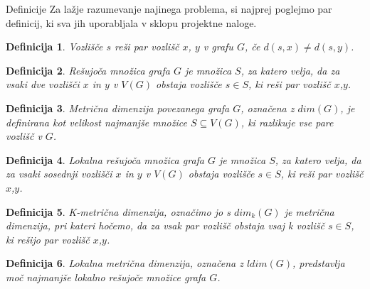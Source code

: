 \documentclass[12pt,a4paper]{amsart}
\makeatletter
\renewcommand\section{\@startsection{section}{1}%
  \z@{.5\linespacing\@plus.7\linespacing}{.5\linespacing}%
  {\normalfont\scshape\large\centering}}
\theoremstyle{plain} %
\newtheorem{definition}{Definicija}[section]
\makeatother
\begin{document}
\bigskip
\section{Definicije}
Za lažje razumevanje najinega problema, si najprej poglejmo par definicij, ki sva jih uporabljala v sklopu projektne naloge.
\begin{definition}
        Vozlišče $s$ reši par vozlišč $x$, $y$ v grafu $G$, če $d(s,x) \neq d(s,y)$.
    \end{definition}

    \begin{definition}
        Rešujoča množica grafa $G$ je množica $S$, za katero velja, da za vsaki dve 
        vozlišči $x$ in $y$ v $V(G)$ obstaja vozlišče $s \in S$, ki reši par vozlišč $x$,$y$.
    \end{definition}

    \begin{definition}
        Metrična dimenzija povezanega grafa $G$, označena z $dim(G)$, je definirana kot velikost najmanjše 
        množice $S \subseteq V(G)$, ki razlikuje vse pare vozlišč v $G$.
    \end{definition}     

    \begin{definition}
        Lokalna rešujoča množica grafa $G$ je množica $S$, za katero velja, da za vsaki sosednji 
        vozlišči $x$ in $y$ v $V(G)$ obstaja vozlišče $s \in S$, ki reši par vozlišč $x$,$y$.
    \end{definition}

    \begin{definition}
        K-metrična dimenzija, označimo jo s $dim_k(G)$ je metrična dimenzija, 
        pri kateri hočemo, da za vsak par vozlišč obstaja vsaj k vozlišč $s \in S$, ki rešijo par vozlišč $x$,$y$.
    \end{definition}   
    
    \begin{definition}
        Lokalna metrična dimenzija, označena z $ldim(G)$, predstavlja moč najmanjše 
        lokalno rešujoče množice grafa $G$.
    \end{definition} 

\bigskip


\end{document}
